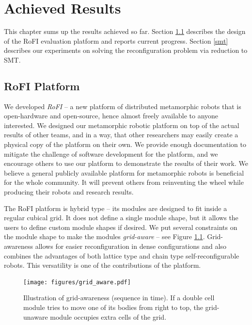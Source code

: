 \chapter{Achieved Results}\label{chap:results}

This chapter sums up the results achieved so far. Section \ref{platform}
describes the design of the RoFI evaluation platform and reports current
progress. Section \ref{smt} describes our experiments on solving the
reconfiguration problem via reduction to SMT.

\section{RoFI Platform}\label{platform}

We developed \emph{RoFI} -- a new platform of distributed metamorphic robots
that is open-hardware and open-source, hence almost freely available to anyone
interested. We designed our metamorphic robotic platform on top of the actual
results of other teams, and in a way, that other researchers may easily create a
physical copy of the platform on their own. We provide enough documentation to
mitigate the challenge of software development for the platform, and we
encourage others to use our platform to demonstrate the results of their work.
We believe a general publicly available platform for metamorphic robots is
beneficial for the whole community. It will prevent others from reinventing the
wheel while producing their robots and research results.

The RoFI platform is hybrid type -- its modules are designed to fit inside a
regular cubical grid. It does not define a single module shape, but it allows
the users to define custom module shapes if desired. We put several constraints
on the module shape to make the modules \emph{grid-aware} -- see Figure
\ref{fig:gridAware}. Grid-awareness allows for easier reconfiguration in dense
configurations and also combines the advantages of both lattice type and chain
type self-reconfigurable robots. This versatility is one of the contributions of
the platform.

\begin{figure}[t]
    \centering
    \texttt{[image: figures/grid\_aware.pdf]}
    \caption{Illustration of grid-awareness (sequence in time). If
    a double cell module tries to move one of its bodies from right to top, the
    grid-unaware module occupies extra cells of the grid.}
    \label{fig:gridAware}
\end{figure}

